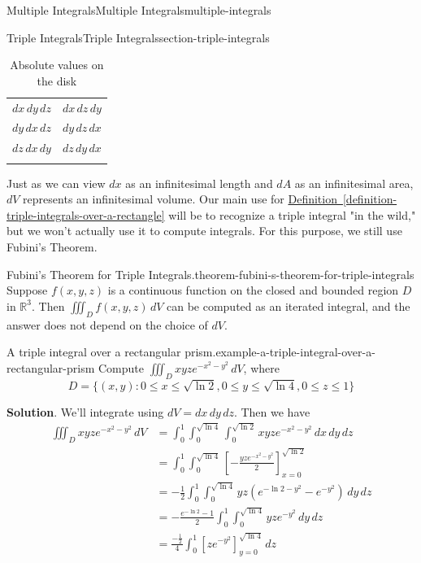 \documentclass[oneside,10pt,]{book}
\numberwithin{equation}{section}
\newcommand{\hrulethick} {\noalign{\hrule height 0.11em}}
\newcommand{\RR}{\mathbb{R}}
\begin{document}
\begin{chapterptx}{Multiple Integrals}{}{Multiple Integrals}{}{}{multiple-integrals}
\begin{sectionptx}{Triple Integrals}{}{Triple Integrals}{}{}{section-triple-integrals}
\begin{table}
\centering
\begin{tabular}{cc}\hrulethick
\(dx\,dy\,dz\)&\(dx\,dz\,dy\)\tabularnewline[0pt]
\(dy\,dx\,dz\)&\(dy\,dz\,dx\)\tabularnewline[0pt]
\(dz\,dx\,dy\)&\(dz\,dy\,dx\)\tabularnewline\hrulethick
\end{tabular}
\caption{Absolute values on the disk\label{table-volume-elements}}
\end{table}
 Just as we can view \(dx\) as an infinitesimal length and \(dA\) as an infinitesimal area, \(dV\) represents an infinitesimal volume.%
Our main use for \hyperref[definition-triple-integrals-over-a-rectangle]{Definition~\ref{definition-triple-integrals-over-a-rectangle}} will be to recognize a triple integral "in the wild," but we won't actually use it to compute integrals. For this purpose, we still use Fubini's Theorem.\begin{theorem}{Fubini's Theorem for Triple Integrals.}{}{theorem-fubini-s-theorem-for-triple-integrals}%
\hypertarget{p-1511}{}%
Suppose \(f(x,y,z)\) is a continuous function on the closed and bounded region \(D\) in \(\RR^{3}\). Then \(\iiint_{D}f(x,y,z)\,dV\) can be computed as an iterated integral, and the answer does not depend on the choice of \(dV\).%
\end{theorem}
\begin{example}{A triple integral over a rectangular prism.}{example-a-triple-integral-over-a-rectangular-prism}%
\hypertarget{p-1512}{}%
Compute \(\iiint_{D}xyze^{-x^{2} - y^{2}}\,dV\), where%
\begin{equation*}
D = \{(x,y) : 0\leq x\leq\sqrt{\ln2}, 0\leq y\leq\sqrt{\ln4}, 0\leq z\leq 1\}
\end{equation*}
%
\par\smallskip%
\noindent\textbf{Solution}.\hypertarget{solution-248}{}\quad%
\hypertarget{p-1513}{}%
We'll integrate using \(dV = dx\,dy\,dz\). Then we have%
\begin{align*}
\iiint_{D}xyze^{-x^{2} - y^{2}}\,dV & = \int_{0}^{1}\int_{0}^{\sqrt{\ln4}}\int_{0}^{\sqrt{\ln2}} xyze^{-x^{2} - y^{2}}\,dx\,dy\,dz \\
& = \int_{0}^{1}\int_{0}^{\sqrt{\ln4}}\left[-\frac{yze^{-x^{2} - y^{2}}}{2}\right]_{x=0}^{\sqrt{\ln2}} \\
& = -\frac{1}{2}\int_{0}^{1}\int_{0}^{\sqrt{\ln4}} yz(e^{-\ln2 - y^{2}} - e^{-y^{2}})\,dy\,dz \\
& = -\frac{e^{-\ln2} - 1}{2}\int_{0}^{1}\int_{0}^{\sqrt{\ln4}} yze^{-y^{2}}\,dy\,dz \\
& = \frac{-\frac{1}{2}}{4}\int_{0}^{1}\left[ze^{-y^{2}}\right]_{y=0}^{\sqrt{\ln4}}\,dz \\

\end{align*}
\end{example}
\end{sectionptx}
\end{chapterptx}
\end{document}
